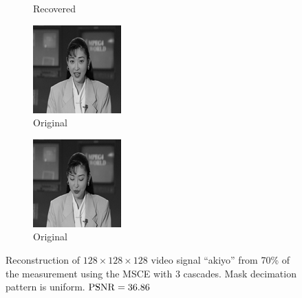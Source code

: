 \begin{figure}
\begin{subfigure}{0.4\textwidth}
    \caption{Recovered}
  \end{subfigure}
  \begin{subfigure}{0.4\textwidth}
    \centering
    \includegraphics[width=.9\textwidth]{Chapter7/Images/akiyo70_orig_32.png}
    \caption{Original}
  \end{subfigure}
  \begin{subfigure}{0.4\textwidth}
    \centering
    \includegraphics[width=.9\textwidth]{Chapter7/Images/akiyo70_orig_52.png}
    \caption{Original}
  \end{subfigure}
  \caption{Reconstruction of $128\times 128\times 128$ video signal ``akiyo'' from 70\% of the measurement using the MSCE with 3 cascades. Mask decimation pattern is uniform. $\operatorname*{PSNR} = 36.86$}
\end{figure}

